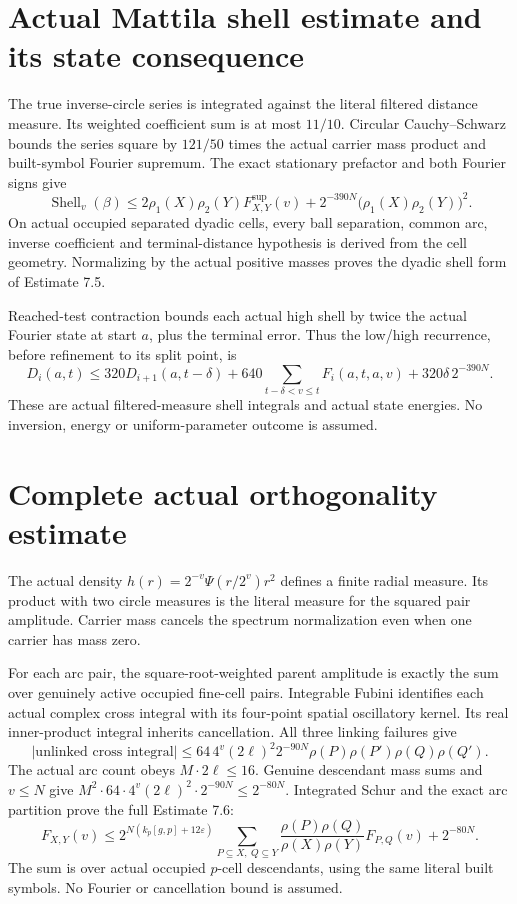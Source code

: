 \documentclass[11pt]{article}
\begin{document}
\section*{Actual Mattila shell estimate and its state consequence}
The true inverse-circle series is integrated against the literal filtered
distance measure. Its weighted coefficient sum is at most $11/10$.
Circular Cauchy--Schwarz bounds the series square by $121/50$ times the
actual carrier mass product and built-symbol Fourier supremum.
The exact stationary prefactor and both Fourier signs give
\[
\operatorname{Shell}_v(\beta)\le
2\rho_1(X)\rho_2(Y)F^{\mathrm{sup}}_{X,Y}(v)
+2^{-390N}\bigl(\rho_1(X)\rho_2(Y)\bigr)^2.
\]
On actual occupied separated dyadic cells, every ball separation, common arc,
inverse coefficient and terminal-distance hypothesis is derived from the
cell geometry. Normalizing by the actual positive masses proves the dyadic
shell form of Estimate 7.5.

Reached-test contraction bounds each actual high shell by twice the actual
Fourier state at start $a$, plus the terminal error. Thus the low/high
recurrence, before refinement to its split point, is
\[
D_i(a,t)\le320D_{i+1}(a,t-\delta)
+640\sum_{t-\delta<v\le t}F_i(a,t,a,v)
+320\delta\,2^{-390N}.
\]
These are actual filtered-measure shell integrals and actual state energies.
No inversion, energy or uniform-parameter outcome is assumed.

\newpage
\section*{Complete actual orthogonality estimate}
The actual density $h(r)=2^{-v}\Psi(r/2^v)r^2$ defines a finite radial measure.
Its product with two circle measures is the literal measure for the squared
pair amplitude. Carrier mass cancels the spectrum normalization even when
one carrier has mass zero.

For each arc pair, the square-root-weighted parent amplitude is exactly the
sum over genuinely active occupied fine-cell pairs. Integrable Fubini
identifies each actual complex cross integral with its four-point spatial
oscillatory kernel. Its real inner-product integral inherits cancellation.
All three linking failures give
\[
|\text{unlinked cross integral}|\le
64\,4^v(2\ell)^2 2^{-90N}
\rho(P)\rho(P')\rho(Q)\rho(Q').
\]
The actual arc count obeys $M\cdot2\ell\le16$. Genuine descendant mass sums and
$v\le N$ give $M^2\cdot64\cdot4^v(2\ell)^2\cdot2^{-90N}\le2^{-80N}$.
Integrated Schur and the exact arc partition prove the full Estimate 7.6:
\[
F_{X,Y}(v)\le2^{N(k_p[g,p]+12\varepsilon)}
\sum_{P\subseteq X,\ Q\subseteq Y}
\frac{\rho(P)\rho(Q)}{\rho(X)\rho(Y)}F_{P,Q}(v)+2^{-80N}.
\]
The sum is over actual occupied $p$-cell descendants, using the same literal
built symbols. No Fourier or cancellation bound is assumed.
\end{document}
